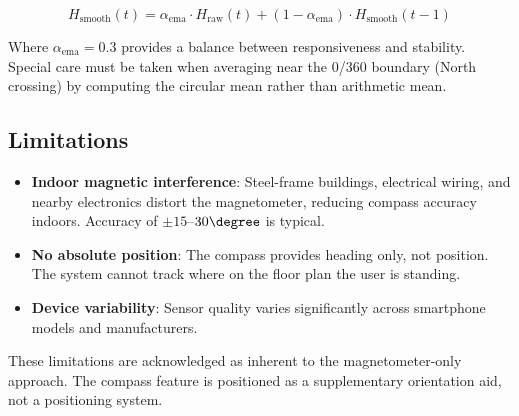 \begin{equation}
H_{\text{smooth}}(t) = \alpha_{\text{ema}} \cdot H_{\text{raw}}(t) + (1 - \alpha_{\text{ema}}) \cdot H_{\text{smooth}}(t-1)
\label{eq:heading-ema}
\end{equation}

Where $\alpha_{\text{ema}} = 0.3$ provides a balance between responsiveness and stability. Special care must be taken when averaging near the 0/360 boundary (North crossing) by computing the circular mean rather than arithmetic mean.

\subsection{Limitations}

\begin{itemize}
  \item \textbf{Indoor magnetic interference}: Steel-frame buildings, electrical wiring, and nearby electronics distort the magnetometer, reducing compass accuracy indoors. Accuracy of $\pm 15$--$30\degree$ is typical.
  \item \textbf{No absolute position}: The compass provides heading only, not position. The system cannot track where on the floor plan the user is standing.
  \item \textbf{Device variability}: Sensor quality varies significantly across smartphone models and manufacturers.
\end{itemize}

These limitations are acknowledged as inherent to the magnetometer-only approach. The compass feature is positioned as a supplementary orientation aid, not a positioning system.
